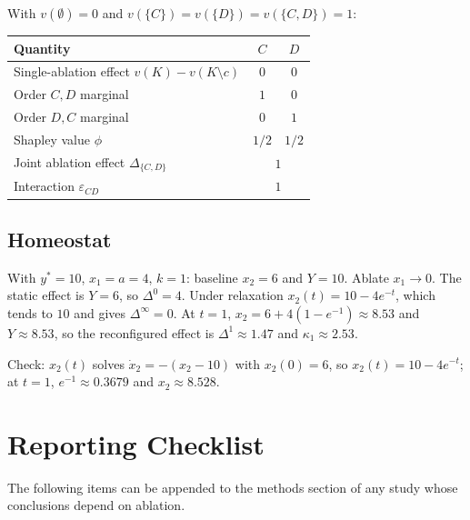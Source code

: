 \documentclass[11pt]{article}
\theoremstyle{definition}
\theoremstyle{remark}
\begin{document}
With $v(\emptyset)=0$ and $v(\{C\})=v(\{D\})=v(\{C,D\})=1$:
\begin{center}
\small
\begin{tabular}{lcc}
\toprule
Quantity & $C$ & $D$\\
\midrule
Single-ablation effect $v(K)-v(K\setminus c)$ & $0$ & $0$\\
Order $C,D$ marginal & $1$ & $0$\\
Order $D,C$ marginal & $0$ & $1$\\
Shapley value $\phi$ & $1/2$ & $1/2$\\
Joint ablation effect $\Delta_{\{C,D\}}$ & \multicolumn{2}{c}{$1$}\\
Interaction $\varepsilon_{CD}$ & \multicolumn{2}{c}{$1$}\\
\bottomrule
\end{tabular}
\end{center}

\subsection{Homeostat}

With $y^*=10$, $x_1=a=4$, $k=1$: baseline $x_2=6$ and $Y=10$. Ablate $x_1\to0$. The static effect is $Y=6$, so $\Delta^0=4$. Under relaxation $x_2(t)=10-4e^{-t}$, which tends to $10$ and gives $\Delta^\infty=0$. At $t=1$, $x_2=6+4(1-e^{-1})\approx 8.53$ and $Y\approx 8.53$, so the reconfigured effect is $\Delta^{1}\approx1.47$ and $\kappa_1\approx 2.53$.

Check: $x_2(t)$ solves $\dot x_2=-(x_2-10)$ with $x_2(0)=6$, so $x_2(t)=10-4e^{-t}$; at $t=1$, $e^{-1}\approx0.3679$ and $x_2\approx 8.528$.

\section{Reporting Checklist}\label{app:checklist}

The following items can be appended to the methods section of any study whose conclusions depend on ablation.
\end{document}

